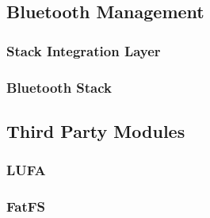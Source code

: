 
\FloatBarrier
\subsection{Bluetooth Management}


\FloatBarrier
\subsubsection{Stack Integration Layer}


\FloatBarrier
\subsubsection{Bluetooth Stack}


\FloatBarrier
\subsection{Third Party Modules}


\FloatBarrier
\subsubsection{LUFA}


\FloatBarrier
\subsubsection{FatFS}

